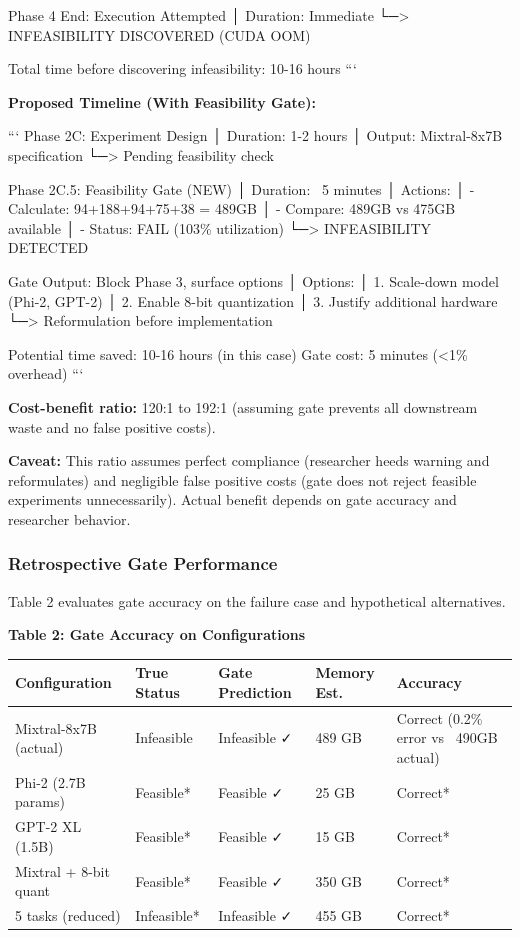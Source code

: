 Phase 4 End: Execution Attempted
│ Duration: Immediate
└─> INFEASIBILITY DISCOVERED (CUDA OOM)

Total time before discovering infeasibility: 10-16 hours
```

\textbf{Proposed Timeline (With Feasibility Gate):}

```
Phase 2C: Experiment Design
│ Duration: 1-2 hours
│ Output: Mixtral-8x7B specification
└─> Pending feasibility check

Phase 2C.5: Feasibility Gate (NEW)
│ Duration: ~5 minutes
│ Actions: 
│   - Calculate: 94+188+94+75+38 = 489GB
│   - Compare: 489GB vs 475GB available
│   - Status: FAIL (103\% utilization)
└─> INFEASIBILITY DETECTED

Gate Output: Block Phase 3, surface options
│ Options:
│   1. Scale-down model (Phi-2, GPT-2)
│   2. Enable 8-bit quantization
│   3. Justify additional hardware
└─> Reformulation before implementation

Potential time saved: 10-16 hours (in this case)
Gate cost: 5 minutes (<1\% overhead)
```

\textbf{Cost-benefit ratio:} 120:1 to 192:1 (assuming gate prevents all downstream waste and no false positive costs).

\textbf{Caveat:} This ratio assumes perfect compliance (researcher heeds warning and reformulates) and negligible false positive costs (gate does not reject feasible experiments unnecessarily). Actual benefit depends on gate accuracy and researcher behavior.

\subsubsection{Retrospective Gate Performance}

Table 2 evaluates gate accuracy on the failure case and hypothetical alternatives.

\textbf{Table 2: Gate Accuracy on Configurations}

\begin{table}[htbp]
\centering
\begin{tabular}{lllll}
\toprule
Configuration & True Status & Gate Prediction & Memory Est. & Accuracy \\
\midrule
Mixtral-8x7B (actual) & Infeasible & Infeasible ✓ & 489 GB & Correct (0.2\% error vs ~490GB actual) \\
Phi-2 (2.7B params) & Feasible* & Feasible ✓ & 25 GB & Correct* \\
GPT-2 XL (1.5B) & Feasible* & Feasible ✓ & 15 GB & Correct* \\
Mixtral + 8-bit quant & Feasible* & Feasible ✓ & 350 GB & Correct* \\
5 tasks (reduced) & Infeasible* & Infeasible ✓ & 455 GB & Correct* \\
\bottomrule
\end{tabular}
\end{table}

